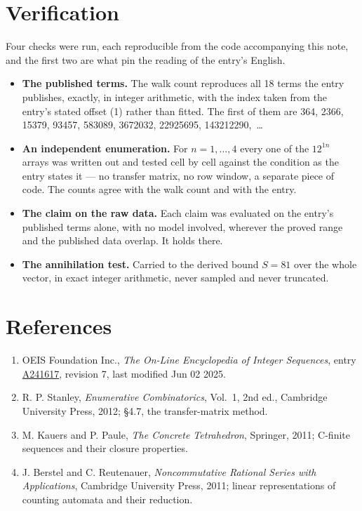 \documentclass[11pt]{article}
\theoremstyle{definition}
\begin{document}
\section{Verification}

Four checks were run, each reproducible from the code accompanying this note, and the first two are what pin the reading of the entry's English.

\begin{itemize}

\item {\bfseries The published terms.} The walk count reproduces all 18 terms the entry publishes, exactly, in integer arithmetic, with the index taken from the entry's stated offset (1) rather than fitted. The first of them are 364, 2366, 15379, 93457, 583089, 3672032, 22925695, 143212290,~\dots

\item {\bfseries An independent enumeration.} For $n = 1,\dots,4$ every one of the $12^{1n}$ arrays was written out and tested cell by cell against the condition as the entry states it --- no transfer matrix, no row window, a separate piece of code. The counts agree with the walk count and with the entry.

\item {\bfseries The claim on the raw data.} Each claim was evaluated on the entry's published terms alone, with no model involved, wherever the proved range and the published data overlap. It holds there.

\item {\bfseries The annihilation test.} Carried to the derived bound $S = 81$ over the whole vector, in exact integer arithmetic, never sampled and never truncated.

\end{itemize}

\section{References}

\begin{enumerate}

\item OEIS Foundation Inc., \emph{The On-Line Encyclopedia of Integer Sequences}, entry \href{https://oeis.org/A241617}{A241617}, revision 7, last modified Jun 02 2025.

\item R. P. Stanley, \emph{Enumerative Combinatorics}, Vol.~1, 2nd ed., Cambridge University Press, 2012; \S4.7, the transfer-matrix method.

\item M. Kauers and P. Paule, \emph{The Concrete Tetrahedron}, Springer, 2011; C-finite sequences and their closure properties.

\item J. Berstel and C. Reutenauer, \emph{Noncommutative Rational Series with Applications}, Cambridge University Press, 2011; linear representations of counting automata and their reduction.

\end{enumerate}
\end{document}
